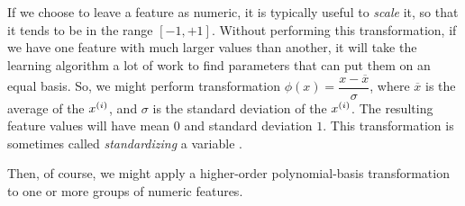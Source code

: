 If we choose to leave a feature as numeric, it is typically useful to
  {\em scale} it, so that it tends to be in the range $[-1, +1]$.
Without performing this transformation, if we have one feature with
much larger values than another, it will take the learning algorithm a
lot of work to find parameters that can put them on an equal basis.
So, we might perform transformation
$\phi(x) = \dfrac{x - \overline{x}}{\sigma}$, where $\overline{x}$
is the average of the $x^{(i)}$, and $\sigma$ is the standard deviation of
the $x^{(i)}$.  The resulting feature values will have mean $0$ and
standard deviation $1$.   This transformation is sometimes called {\em
    standardizing} a variable .

Then, of course, we might apply a higher-order polynomial-basis
transformation to one or more groups of numeric features.





